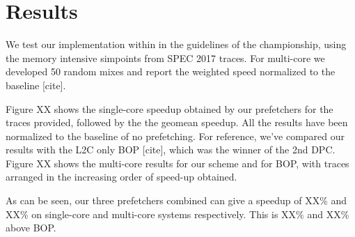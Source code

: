 \section{Results}
\label{Results}

We test our implementation within in the guidelines of the championship, using the
memory intensive simpoints from SPEC 2017 traces. For multi-core we developed 50
random mixes and report the weighted speed normalized to the baseline [cite].

Figure XX shows the single-core speedup obtained by our prefetchers for the traces 
provided, followed by the the geomean speedup. All the results have
been normalized to the baseline of no prefetching. For reference, we've compared
our results with the L2C only BOP [cite], which was the winner of the 2nd DPC.
Figure XX shows the multi-core results for our scheme and for BOP, with traces 
arranged in the increasing order of speed-up obtained.

As can be seen, our three prefetchers combined can give a speedup of XX\% and XX\%
on single-core and multi-core systems respectively. This is XX\% and XX\% above BOP.

